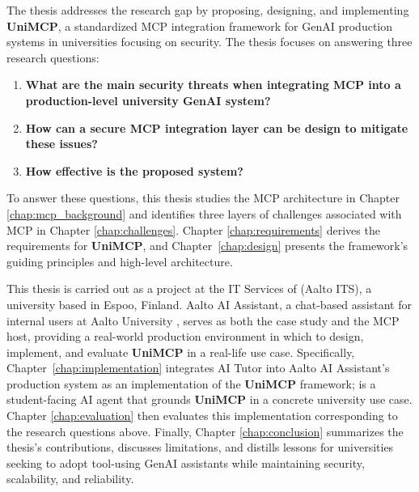 \documentclass[english, 12pt, a4paper, elec, utf8, a-2b, online]{aaltothesis}
\newcommand{\UniMCP}{\textbf{UniMCP}\xspace}
\newcommand{\aitutor}{\text{AI Tutor}\xspace}
\newcommand{\aalto}{\text{Aalto University}\xspace}
\begin{document}
The thesis addresses the research gap by proposing, designing, and implementing \UniMCP, a standardized MCP integration framework for GenAI production systems in universities focusing on security.
The thesis focuses on answering three research questions: 
\begin{enumerate}
    \item \textbf{What are the main security threats when integrating MCP into a production-level university GenAI system?}
    \item \textbf{How can a secure MCP integration layer can be design to mitigate these issues?}
    \item \textbf{How effective is the proposed system?}
\end{enumerate}

To answer these questions, this thesis studies the MCP architecture in Chapter \ref{chap:mcp_background} and identifies three layers of challenges associated with MCP in Chapter \ref{chap:challenges}. 
Chapter \ref{chap:requirements} derives the requirements for \UniMCP, and Chapter~\ref{chap:design} presents the framework's guiding principles and high-level architecture.

This thesis is carried out as a project at the IT Services of \aalto (Aalto ITS), a university based in Espoo, Finland.
Aalto AI Assistant, a chat-based assistant for internal users at Aalto University \cite{aalto_ai_assistant}, serves as both the case study and the MCP host, providing a real-world production environment in which to design, implement, and evaluate \UniMCP in a real-life use case. 
Specifically, Chapter~\ref{chap:implementation} integrates AI Tutor into Aalto AI Assistant's production system as an implementation of the \UniMCP framework; \aitutor is a student-facing AI agent that grounds \UniMCP in a concrete university use case.  
Chapter \ref{chap:evaluation} then evaluates this implementation corresponding to the research questions above.
Finally, Chapter \ref{chap:conclusion} summarizes the thesis's contributions, discusses limitations, and distills lessons for universities seeking to adopt tool-using GenAI assistants while maintaining security, scalability, and reliability.
\end{document}
